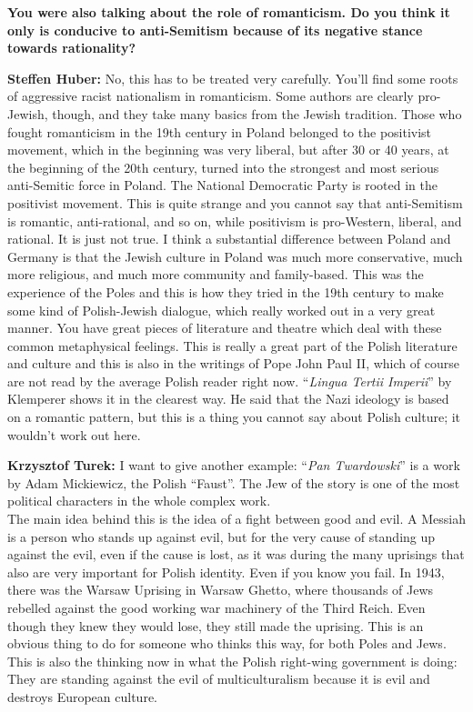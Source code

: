 \textbf{You were also talking about the role of romanticism. Do you think it only is conducive to anti-Semitism because of its negative stance towards rationality?} 

\textbf{Steffen Huber:} No, this has to be treated very carefully. You’ll find some roots of aggressive racist nationalism in romanticism. Some authors are clearly pro-Jewish, though, and they take many basics from the Jewish tradition. Those who fought romanticism in the 19th century in Poland belonged to the positivist movement, which in the beginning was very liberal, but after 30 or 40 years, at the beginning of the 20th century, turned into the strongest and most serious anti-Semitic force in Poland. The National Democratic Party is rooted in the positivist movement. This is quite strange and you cannot say that anti-Semitism is romantic, anti-rational, and so on, while positivism is pro-Western, liberal, and rational. It is just not true. I think a substantial difference between Poland and Germany is that the Jewish culture in Poland was much more conservative, much more religious, and much more community and family-based. This was the experience of the Poles and this is how they tried in the 19th century to make some kind of Polish-Jewish dialogue, which really worked out in a very great manner. You have great pieces of literature and theatre which deal with these common metaphysical feelings. This is really a great part of the Polish literature and culture and this is also in the writings of Pope John Paul II, which of course are not read by the average Polish reader right now. ``\textit{Lingua Tertii Imperii}'' by Klemperer shows it in the clearest way. He said that the Nazi ideology is based on a romantic pattern, but this is a thing you cannot say about Polish culture; it wouldn't work out here.\par 
\textbf{Krzysztof Turek:} I want to give another example: ``\textit{Pan Twardowski}'' is a work by Adam Mickiewicz, the Polish ``Faust''. The Jew of the story is one of the most political characters in the whole complex work.\\
The main idea behind this is the idea of a fight between good and evil. A Messiah is a person who stands up against evil, but for the very cause of standing up against the evil, even if the cause is lost, as it was during the many uprisings that also are very important for Polish identity. Even if you know you fail. In 1943, there was the Warsaw Uprising in Warsaw Ghetto, where thousands of Jews rebelled against the good working war machinery of the Third Reich. Even though they knew they would lose, they still made the uprising. This is an obvious thing to do for someone who thinks this way, for both Poles and Jews. This is also the thinking now in what the Polish right-wing government is doing: They are standing against the evil of multiculturalism because it is evil and destroys European culture.\par
